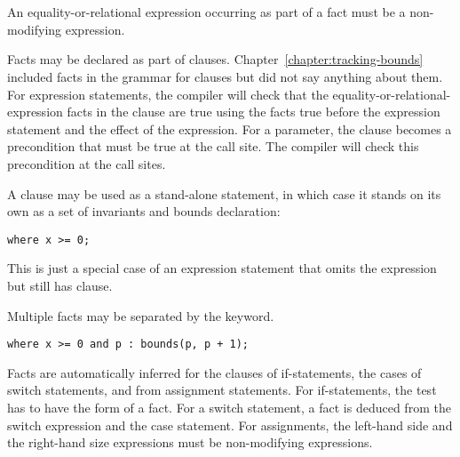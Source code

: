 \begin{tabbing}
\=\\
\>  \\
\>  \\
\> 
\end{tabbing}

\begin{tabbing}
\=\\
\>  \\
\>  \\
\>  \\
\> 
\end{tabbing}

An equality-or-relational expression occurring as part of a fact must be a
non-modifying expression.

Facts may be declared as part of  clauses.  
Chapter~\ref{chapter:tracking-bounds} included facts in
the grammar for  clauses but did not say
anything about them. For expression statements, the compiler
will check that the equality-or-relational-expression facts in the
 clause are true using the facts true before the expression
statement and the effect of the expression. For a parameter, the
 clause becomes a precondition that must be true at the call
site. The compiler will check this precondition at the call sites.

A  clause may be used as a stand-alone statement, 
in which case it stands on its own as a set of invariants and bounds
declaration:
\begin{lstlisting}
where x >= 0;
\end{lstlisting}
This is just a special case of an expression statement
that omits the expression but still has  clause.

Multiple facts may be separated by the  keyword.
\begin{lstlisting}
where x >= 0 and p : bounds(p, p + 1);
\end{lstlisting}

Facts are automatically inferred for the clauses of if-statements, the cases of
switch statements, and from assignment statements.  For if-statements, the test
has to have the form of a fact. For a switch statement, a fact is deduced from
the switch expression and the case statement. For assignments, the left-hand
side and the right-hand size expressions must be non-modifying expressions.

